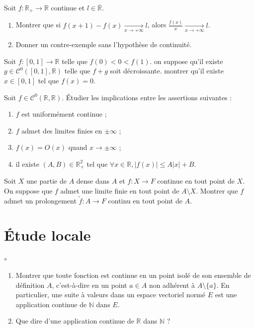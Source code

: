 \documentclass[french,a4paper]{article}
\newcommand{\N}{\mathbb{N}}
\newcommand{\R}{\mathbb{R}}
\theoremstyle{plain}
\theoremstyle{definition}
\theoremstyle{remark}
\begin{document}
\begin{ex}[Moulin.04]{}
	Soit $f:\R_+\to\R$ continue et $l\in\overline{\R}$.
	\begin{enumerate}
		\item Montrer que si $f(x+1)-f(x)\xrightarrow[x\to+\infty]{}l$, alors $\displaystyle\frac{f(x)}{x}\xrightarrow[x\to+\infty]{}l$.
		\item Donner un contre-exemple sans l'hypothèse de continuité.
	\end{enumerate}
\end{ex}

\begin{ex}[Moulin.05]{}
	Soit $f:[0,1]\to\R$ telle que $f(0)<0<f(1)$. on suppose qu'il existe $g\in\mathcal{C}^0([0,1],\R)$ telle que $f+g$ soit décroissante. montrer qu'il existe $x\in[0,1]$ tel que $f(x)=0$.
\end{ex}

\begin{ex}[Moulin.06]{}
	Soit $f\in\mathcal{C}^0(\R,\R)$. Étudier les implications entre les assertions suivantes :
	\begin{enumerate}[label=(\roman*)]
		\item $f$ est uniformément continue ;
		\item $f$ admet des limites finies en $\pm\infty$ ;
		\item $f(x)=O(x)$ quand $x\to\pm\infty$ ;
		\item il existe $(A,B)\in\R_+^2$ tel que $\forall x\in\R, \lvert f(x)\rvert\leqslant A\lvert x\rvert+B$.
	\end{enumerate}
\end{ex}

\begin{ex}[Moulin.07]{}
	Soit $X$ une partie de $A$ dense dans $A$ et $f:X\to F$ continue en tout point de $X$. On suppose que $f$ admet une limite finie en tout point de $A\setminus X$. Montrer que $f$ admet un prolongement $\tilde{f}:A\to F$ continu en tout point de $A$.
\end{ex}

\section{Étude locale}

\begin{ex}[Moulin.08]{$\circ$}
	\begin{enumerate}
		\item Montrer que toute fonction est continue en un point isolé de son ensemble de définition $A$, c'est-à-dire en un point $a\in A$ non adhérent à $A\setminus\{a\}$. En particulier, une suite à valeurs dans un espace vectoriel normé $E$ est une application continue de $\N$ dans $E$.
		\item Que dire d'une application continue de $\R$ dans $\N$ ?
	\end{enumerate}
\end{ex}
\end{document}
